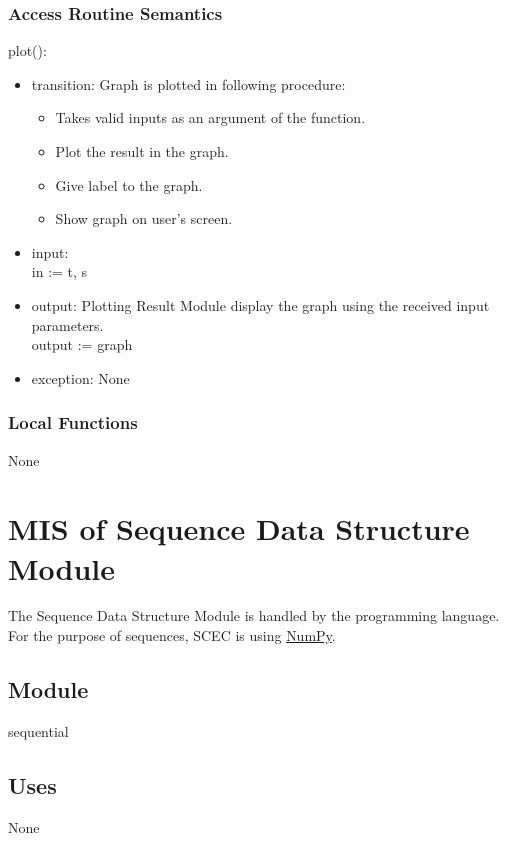 \documentclass[12pt, titlepage]{article}
\begin{document}
\subsubsection{Access Routine Semantics}

\noindent plot():
\begin{itemize}
\item transition: Graph is plotted in following procedure: 
\begin{itemize}
    \item Takes valid inputs as an argument of the function. 
    \item Plot the result in the graph. 
    \item Give label to the graph. 
    \item Show graph on user's screen. 
\end{itemize}
\item input: \\ 
in := t, s 
\item output: Plotting Result Module display the graph using the received input parameters. \\ 
output := graph
\item exception: 
None
\end{itemize}


\subsubsection{Local Functions}

None


\section{MIS of Sequence Data Structure Module} \label{Sequence_Data_Structure_Module} 

The Sequence Data Structure Module is handled by the programming language. For the purpose of sequences, SCEC is using \href{https://numpy.org}{NumPy}.  

\subsection{Module}

sequential

\subsection{Uses}

None
\end{document}
